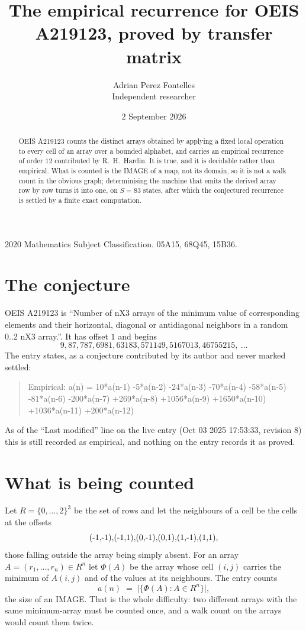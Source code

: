 \documentclass[11pt,a4paper]{article}
\title{The empirical recurrence for OEIS A219123, proved by transfer matrix}
\author{Adrian Perez Fontelles\\ \small Independent researcher}
\date{2 September 2026}
\theoremstyle{plain}
\theoremstyle{definition}
\begin{document}
\maketitle

\begin{abstract}
OEIS A219123 counts the distinct arrays obtained by applying a fixed local operation to every cell
of an array over a bounded alphabet, and carries an empirical recurrence of order $12$
contributed by R.~H.~Hardin. It is true, and it is decidable rather than empirical. What is
counted is the IMAGE of a map, not its domain, so it is not a walk count in the obvious graph;
determinising the machine that emits the derived array row by row turns it into one, on
$S=83$ states, after which the conjectured recurrence is settled by a finite exact
computation.
\end{abstract}

\noindent\small 2020 Mathematics Subject Classification. 05A15, 68Q45, 15B36.\normalsize

\section{The conjecture}

OEIS A219123 is ``Number of nX3 arrays of the minimum value of corresponding elements and their horizontal, diagonal or antidiagonal neighbors in a random 0..2 nX3 array.''. It has offset $1$ and begins
\[
9, 87, 787, 6981, 63183, 571149, 5167013, 46755215,\ \dots
\]
The entry states, as a conjecture contributed by its author and never marked settled:
\begin{quote}
Empirical: a(n) = 10*a(n-1) -5*a(n-2) -24*a(n-3) -70*a(n-4) -58*a(n-5) -81*a(n-6) -200*a(n-7) +269*a(n-8) +1056*a(n-9) +1650*a(n-10) +1036*a(n-11) +200*a(n-12)
\end{quote}
As of the ``Last modified'' line on the live entry (Oct 03 2025 17:53:33, revision 8) this is still
recorded as empirical, and nothing on the entry records it as proved.

\section{What is being counted}

Let $R=\{0,\dots,2\}^{3}$ be the set of rows and let the neighbours of
a cell be the cells at the offsets
\[
$(-1,-1)$, $(-1,1)$, $(0,-1)$, $(0,1)$, $(1,-1)$, $(1,1)$,
\]
those falling outside the array being simply absent. For an array
$A=(r_1,\dots,r_n)\in R^n$ let $\Phi(A)$ be the array whose cell $(i,j)$ carries the
minimum of $A(i,j)$ and of the values at its neighbours. The entry counts
\[
a(n)\;=\;\bigl|\{\Phi(A):A\in R^n\}\bigr| ,
\]
the size of an IMAGE. That is the whole difficulty: two different arrays with the same
minimum-array must be counted once, and a walk count on the arrays would count them twice.
\end{document}
